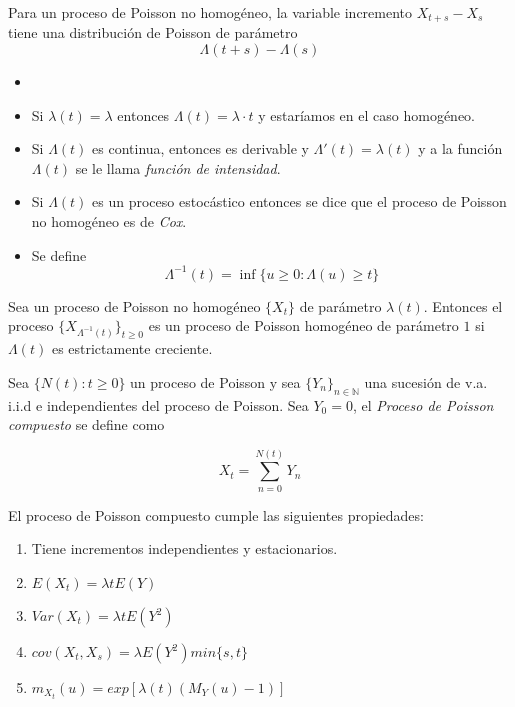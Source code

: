 \documentclass[PREyA.tex]{subfiles}
\begin{document}
\begin{prop}
	Para un proceso de Poisson no homogéneo, la variable incremento $X_{t+s}-X_{s}$ tiene una distribución de Poisson de parámetro $$\Lambda(t+s)-\Lambda(s)$$
\end{prop}
\begin{nota}
\begin{itemize}
\item[]
\item Si $\lambda(t)= \lambda$ entonces $\Lambda(t)= \lambda \cdot t$ y estaríamos en el caso homogéneo.
\item Si $\Lambda(t)$ es continua, entonces es derivable y $\Lambda'(t)=\lambda(t)$ y a la función $\Lambda(t)$ se le llama \textit{función de intensidad}.
\item Si $\Lambda(t)$ es un proceso estocástico entonces se dice que el proceso de Poisson no homogéneo es de \textit{Cox}.
\item Se define
	$$ \Lambda^{-1}(t) = \inf \{ u \geq 0: \Lambda(u) \geq t \}$$ 
\end{itemize}
\end{nota}
\begin{prop}
	Sea un proceso de Poisson no homogéneo $\{X_{t} \}$ de parámetro $\lambda(t)$. Entonces el proceso $\{X_{\Lambda^{-1}(t)}\}_{ t \geq 0}$  es un proceso de Poisson homogéneo de parámetro $1$ si $\Lambda(t)$ es estrictamente creciente.
\end{prop}



\begin{defi}
	Sea $\{ N(t) : t \geq 0 \}$ un proceso de Poisson y sea $\{ Y_{n} \}_{n \in \mathbb{N}}$ una sucesión de v.a. i.i.d e independientes del proceso de Poisson. Sea $Y_{0} = 0$, el \textit{Proceso de Poisson compuesto} se define como
	
	$$ X_{t} = \sum_{n=0}^{N(t)} Y_{n}$$
	
\end{defi}

\newpage
\begin{prop}
	El proceso de Poisson compuesto cumple las siguientes propiedades:
	\begin{enumerate}
		\item Tiene incrementos independientes y estacionarios.
		
		\item $E(X_{t}) = \lambda t E(Y)$
		
		\item $Var(X_{t}) = \lambda t E(Y^{2})$
		
		\item $cov(X_t, X_s) = \lambda E(Y^{2}) min\{s,t\}$
		
		\item $m_{X_{t}} (u) = exp[\lambda (t) (M_{Y} (u) -1)]$
	\end{enumerate}
\end{prop}
\end{document}
